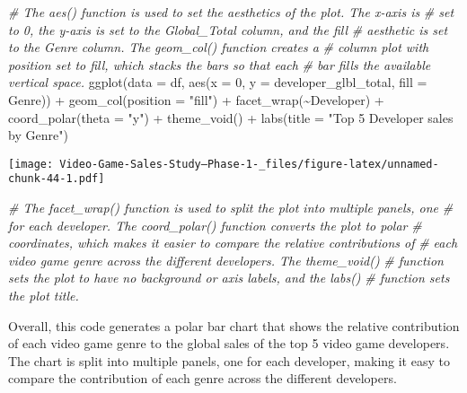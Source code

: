\documentclass[
]{article}
\newenvironment{Shaded}{\begin{snugshade}}{\end{snugshade}}
\newcommand{\AttributeTok}[1]{\textcolor[rgb]{0.77,0.63,0.00}{#1}}
\newcommand{\CommentTok}[1]{\textcolor[rgb]{0.56,0.35,0.01}{\textit{#1}}}
\newcommand{\DecValTok}[1]{\textcolor[rgb]{0.00,0.00,0.81}{#1}}
\newcommand{\FunctionTok}[1]{\textcolor[rgb]{0.00,0.00,0.00}{#1}}
\newcommand{\NormalTok}[1]{#1}
\newcommand{\SpecialCharTok}[1]{\textcolor[rgb]{0.00,0.00,0.00}{#1}}
\newcommand{\StringTok}[1]{\textcolor[rgb]{0.31,0.60,0.02}{#1}}
\begin{document}
\begin{Shaded}
\begin{Highlighting}[]
\CommentTok{\# The aes() function is used to set the aesthetics of the plot. The x{-}axis is}
\CommentTok{\# set to 0, the y{-}axis is set to the Global\_Total column, and the fill}
\CommentTok{\# aesthetic is set to the Genre column. The geom\_col() function creates a}
\CommentTok{\# column plot with position set to \textquotesingle{}fill\textquotesingle{}, which stacks the bars so that each}
\CommentTok{\# bar fills the available vertical space.}
\FunctionTok{ggplot}\NormalTok{(}\AttributeTok{data =}\NormalTok{ df, }\FunctionTok{aes}\NormalTok{(}\AttributeTok{x =} \DecValTok{0}\NormalTok{, }\AttributeTok{y =}\NormalTok{ developer\_glbl\_total, }\AttributeTok{fill =}\NormalTok{ Genre)) }\SpecialCharTok{+} \FunctionTok{geom\_col}\NormalTok{(}\AttributeTok{position =} \StringTok{"fill"}\NormalTok{) }\SpecialCharTok{+}
    \FunctionTok{facet\_wrap}\NormalTok{(}\SpecialCharTok{\textasciitilde{}}\NormalTok{Developer) }\SpecialCharTok{+} \FunctionTok{coord\_polar}\NormalTok{(}\AttributeTok{theta =} \StringTok{"y"}\NormalTok{) }\SpecialCharTok{+} \FunctionTok{theme\_void}\NormalTok{() }\SpecialCharTok{+} \FunctionTok{labs}\NormalTok{(}\AttributeTok{title =} \StringTok{"Top 5 Developer sales by Genre"}\NormalTok{)}
\end{Highlighting}
\end{Shaded}

\texttt{[image: Video-Game-Sales-Study--Phase-1-\_files/figure-latex/unnamed-chunk-44-1.pdf]}

\begin{Shaded}
\begin{Highlighting}[]
\CommentTok{\# The facet\_wrap() function is used to split the plot into multiple panels, one}
\CommentTok{\# for each developer. The coord\_polar() function converts the plot to polar}
\CommentTok{\# coordinates, which makes it easier to compare the relative contributions of}
\CommentTok{\# each video game genre across the different developers. The theme\_void()}
\CommentTok{\# function sets the plot to have no background or axis labels, and the labs()}
\CommentTok{\# function sets the plot title.}
\end{Highlighting}
\end{Shaded}

Overall, this code generates a polar bar chart that shows the relative
contribution of each video game genre to the global sales of the top 5
video game developers. The chart is split into multiple panels, one for
each developer, making it easy to compare the contribution of each genre
across the different developers.
\end{document}
